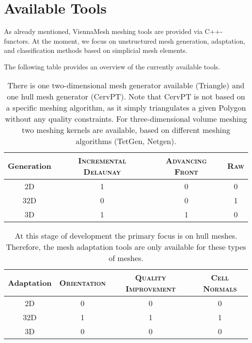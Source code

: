 
\section{Available Tools} 

As already mentioned, ViennaMesh meshing tools are provided via C++-functors.
At the moment, we focus on unstructured mesh generation, adaptation, and 
classification methods based on simplicial mesh elements.

The following table provides an overview of the currently available tools.


\begin{table}[!ht]
\begin{center}
\begin{tabular}{|c|c|c|c|}
\hline
\textbf{Generation} & \textsc{Incremental Delaunay} & \textsc{Advancing Front} & \textsc{Raw} \\  
\hline
\textsc{2D}        &        1 & 0 & 0 \\
\textsc{32D}       &        0 & 0 & 1 \\
\textsc{3D}        &        1 & 1 & 0 \\
\hline
\end{tabular}
\end{center}
\caption{There is one two-dimensional mesh generator available (Triangle) and 
one hull mesh generator (CervPT). Note that CervPT is not based on a specific 
meshing algorithm, as it simply triangulates a given Polygon without any 
quality constraints. For three-dimensional volume meshing 
two meshing kernels are available, based on different meshing algorithms (TetGen, Netgen).}
\end{table} 

\begin{table}[!ht]
\begin{center}
\begin{tabular}{|c|c|c|c|}
\hline
\textbf{Adaptation} & \textsc{Orientation} & \textsc{Quality Improvement} & \textsc{Cell Normals} \\  
\hline
\textsc{2D}         &        0 &        0 &        0 \\
\textsc{32D}        &        1 &        1 &        1 \\
\textsc{3D}         &        0 &        0 &        0 \\
\hline
\end{tabular}
\end{center}
\caption{At this stage of development the primary focus is on hull meshes. Therefore, 
the mesh adaptation tools are only available for these types of meshes.}
\end{table} 

